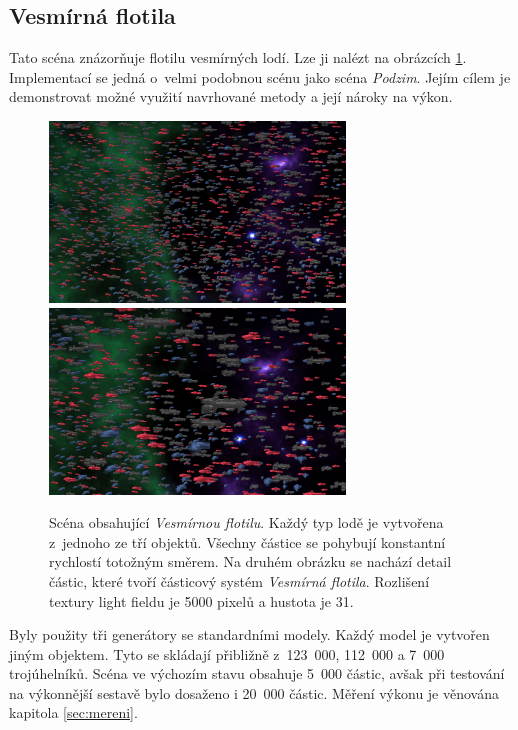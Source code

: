 \subsection*{Vesmírná flotila}
Tato scéna znázorňuje flotilu vesmírných lodí. Lze ji nalézt na obrázcích \ref{fig:ps_flotila}. Implementací se jedná o~velmi podobnou scénu jako scéna \emph{Podzim}. Jejím cílem je demonstrovat možné využití navrhované metody a její nároky na výkon.
\begin{figure}[H]
	\centering
	\includegraphics[width=0.7\textwidth]{obrazky-figures/flotila.png}
	\vspace*{1cm}
	\includegraphics[width=0.7\textwidth]{obrazky-figures/flotila_detail.png}
	\caption{Scéna obsahující \emph{Vesmírnou flotilu}. Každý typ lodě je vytvořena z~jednoho ze tří objektů. Všechny částice se pohybují konstantní rychlostí totožným směrem. Na druhém obrázku se nachází detail částic, které tvoří částicový systém \emph{Vesmírná flotila}. Rozlišení textury light fieldu je 5000 pixelů a hustota je 31.}
	\label{fig:ps_flotila}
\end{figure}


Byly použity tři generátory se standardními modely. Každý model je vytvořen jiným objektem. Tyto se skládají přibližně z~123~000, 112~000 a 7~000 trojúhelníků. Scéna ve výchozím stavu obsahuje 5~000 částic, avšak při testování na výkonnější sestavě bylo dosaženo i 20~000 částic. Měření výkonu je věnována kapitola \ref{sec:mereni}.

